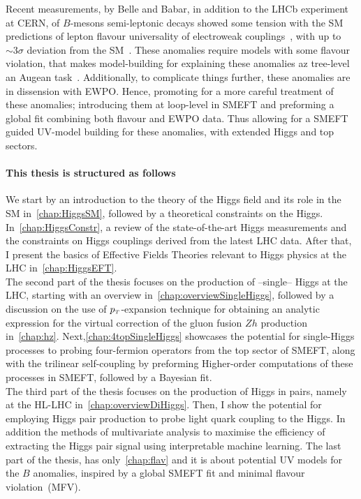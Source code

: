  Recent measurements, by  Belle and Babar, in addition to the LHCb experiment at CERN, of $B$-mesons semi-leptonic decays showed some tension with the SM predictions of lepton flavour universality of electroweak couplings~\cite{Aaij:2014ora,Aaij:2017vbb,Aaij:2019wad,Abdesselam:2019wac,LHCb:2021trn}, with up to $\sim 3\sigma$ deviation from the SM~\cite{Chatrchyan:2013bka,Aaij:2017vad,Aaboud:2018mst,Aaij:2020nol}. These  anomalies require models with some flavour violation, that makes model-building for explaining these anomalies az tree-level an Augean task~\cite{DiLuzio:2017vat,Calibbi:2017qbu,Bordone:2017bld,Barbieri:2017tuq,Assad:2017iib,Heeck:2018ntp,Fornal:2018dqn,Crivellin:2018yvo,Crivellin:2019dwb,Bordone:2019uzc}. Additionally, to complicate things further, these anomalies are in dissension with EWPO. Hence, promoting for a more careful treatment of these anomalies; introducing them at loop-level in SMEFT and preforming a global fit combining both flavour and EWPO data. Thus allowing for a SMEFT guided UV-model building for these anomalies, with extended Higgs and top sectors. \\
 
\paragraph{This thesis is structured as follows\color{Cayenne}{:}}
We start by an introduction to the theory of the Higgs field and its role in the SM in~\autoref{chap:HiggsSM}, followed by a theoretical constraints on the Higgs. In~\autoref{chap:HiggsConstr}, a review of the state-of-the-art Higgs measurements and the constraints on Higgs couplings derived from the latest LHC data. After that, I present the basics of Effective Fields Theories relevant to Higgs physics at the LHC in~\autoref{chap:HiggsEFT}. \\ The second part of the thesis focuses on the production of --single-- Higgs at the LHC, starting with an overview in~\autoref{chap:overviewSingleHiggs}, followed by a discussion on the use of $p_{\scriptscriptstyle T}$-expansion technique for obtaining an analytic expression for the virtual correction of the gluon fusion $Zh$ production in~\autoref{chap:hz}. Next,\autoref{chap:4topSingleHiggs} showcases the potential for single-Higgs processes to probing four-fermion operators from the top sector of SMEFT, along with the trilinear self-coupling by preforming Higher-order computations of these processes in SMEFT, followed by a Bayesian fit. \\ The third part of the thesis focuses on the production of Higgs in pairs, namely at the HL-LHC in~\autoref{chap:overviewDiHiggs}. Then, I show the potential for employing Higgs pair production to probe light quark coupling to the Higgs. In addition the methods of multivariate analysis to maximise the efficiency of extracting the Higgs pair signal using interpretable machine learning.  The last part of the thesis, has only~\autoref{chap:flav} and it is about potential UV models for the $B$ anomalies, inspired by a global SMEFT fit and minimal flavour violation~(MFV). 









